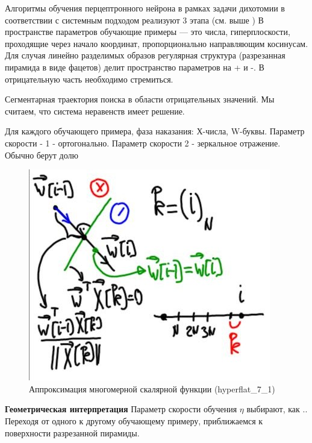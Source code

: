 \documentclass{article}
\numberwithin{equation}{subsection}
\begin{document}
Алгоритмы обучения перцептронного нейрона в рамках задачи дихотомии
в соответствии с системным подходом реализуют 3 этапа (см. выше )
В пространстве параметров обучающие примеры --- это числа, гиперплоскости,
проходящие через начало координат, пропорционально направляющим косинусам.
Для случая линейно разделимых образов регулярная структура (разрезанная пирамида 
в виде фацетов) делит пространство параметров на + и -. 
В отрицательную часть необходимо стремиться.


Сегментарная траектория поиска в области отрицательных значений. Мы
считаем, что система неравенств имеет решение.


Для каждого обучающего примера, фаза наказания:
Х-числа, W-буквы. Параметр скорости - 1 - ортогонально. Параметр скорости 2 -
зеркальное отражение. Обычно берут долю



\begin{figure}[H]
    \centering
    \includegraphics[height=8 cm]{hyperflat_7_1.jpeg}
    \caption{Аппроксимация многомерной скалярной функции (hyperflat\_7\_1)}
    \label{hyperflat_7_1}
\end{figure}

\textbf{Геометрическая интерпретация}
Параметр скорости обучения $\eta$ выбирают, как .. 
Переходя от одного к другому обучающему примеру, приближаемся к поверхности разрезанной 
пирамиды.
\end{document}
